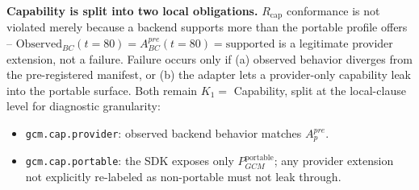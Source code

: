 \documentclass[11pt,a4paper]{article}
\begin{document}
\textbf{Capability is split into two local obligations.} $R_{\text{cap}}$ conformance is not violated merely because a backend supports more than the portable profile offers -- $\text{Observed}_{BC}(t{=}80) = A_{BC}^{pre}(t{=}80) = \text{supported}$ is a legitimate provider extension, not a failure. Failure occurs only if (a) observed behavior diverges from the pre-registered manifest, or (b) the adapter lets a provider-only capability leak into the portable surface. Both remain $K_1=$ Capability, split at the local-clause level for diagnostic granularity:
\begin{itemize}
\item \texttt{gcm.cap.provider}: observed backend behavior matches $A_p^{pre}$.
\item \texttt{gcm.cap.portable}: the SDK exposes only $P_{GCM}^{\text{portable}}$; any provider extension not explicitly re-labeled as non-portable must not leak through.
\end{itemize}
\end{document}
